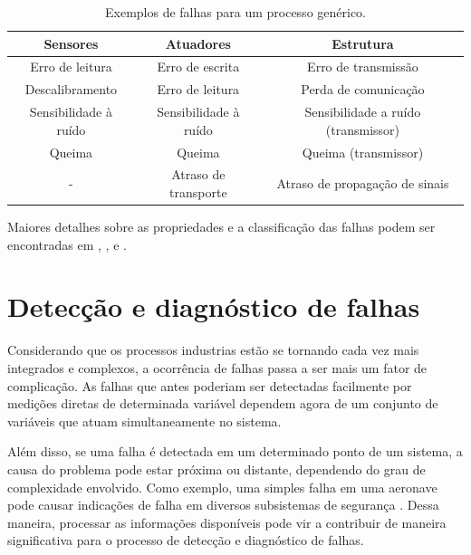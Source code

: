 \begin{table}[htb]
\small
\centering
\caption{Exemplos de falhas para um processo genérico.}
\label{tab:falhas}
\vspace{0.25cm}
\begin{tabular}{|c|c|c|}
\hline
{\bf Sensores} & {\bf Atuadores} & {\bf Estrutura}\\
\hline
\hline
Erro de leitura & Erro de escrita & Erro de transmissão\\
\hline
Descalibramento & Erro de leitura & Perda de comunicação\\
\hline
Sensibilidade à ruído & Sensibilidade à ruído & Sensibilidade a ruído
(transmissor)\\
\hline
Queima & Queima & Queima (transmissor)\\
\hline
- & Atraso de transporte & Atraso de propagação de sinais\\
\hline
\end{tabular}
\end{table}

Maiores detalhes sobre as propriedades e a classificação das falhas podem ser
encontradas em , ,
 e .


\section{Detecção e diagnóstico de falhas}
Considerando que os processos industrias estão se tornando cada vez mais integrados e
complexos, a ocorrência de falhas passa a ser mais um fator de complicação. As
falhas que antes poderiam ser detectadas facilmente por medições diretas de
determinada variável dependem agora de um conjunto de variáveis que atuam
simultaneamente no sistema. 

Além disso, se uma falha é detectada em um determinado ponto de um sistema, a
causa do problema pode estar próxima ou distante, dependendo do grau de
complexidade envolvido. Como exemplo, uma simples falha em uma aeronave pode
causar indicações de falha em diversos subsistemas de segurança
\cite{vach:2006}. Dessa maneira, processar as informações disponíveis pode vir a
contribuir de maneira significativa para o processo de detecção e diagnóstico de
falhas.

